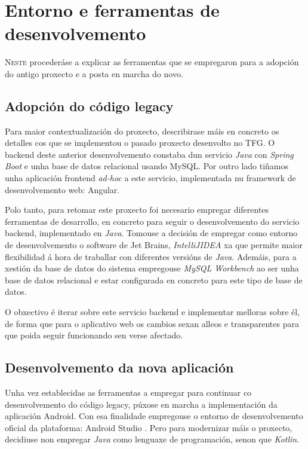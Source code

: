 \chapter{Entorno e ferramentas de desenvolvemento}
\label{chap:ferramentas}

\lettrine{N}{este} procederáse a explicar as ferramentas que se empregaron para a adopción do antigo proxecto e a posta en marcha do novo.


\section{Adopción do código legacy}
\label{sec:adopcion-legacy}

Para maior contextualización do proxecto, describirase máis en concreto os detalles cos que se implementou o pasado proxecto desenvolto no TFG\cite{TFGLuis}. O backend deste anterior desenvolvemento constaba dun servicio \textit{Java} con \textit{Spring Boot} \cite{SpringBoot} e unha base de datos relacional usando MySQL\cite{mysql}.  Por outro lado tiñamos unha aplicación frontend \textit{ad-hoc} a este servicio, implementada nu framework de desenvolvemento web: Angular\cite{angular}.

Polo tanto, para retomar este proxecto foi necesario empregar diferentes ferramentas de desarrollo, en concreto para seguir o desenvolvemento do servicio backend, implementado en \textit{Java}. Tomouse a decisión de empregar como entorno de desenvolvemento o software de Jet Brains, \textit{IntelliJIDEA}\cite{IntelliJIDEA} xa que permite maior flexibilidad á hora de traballar con diferentes versións de \textit{Java}. Ademáis, para a xestión da base de datos do sistema empregouse \textit{MySQL Workbench} ao ser unha base de datos relacional e estar configurada en concreto para este tipo de base de datos.

O obxectivo é iterar sobre este servicio backend e implementar melloras sobre él, de forma que para o aplicativo web os cambios sexan alleos e transparentes para que poida seguir funcionando sen verse afectado.

\section{Desenvolvemento da nova aplicación}
\label{sec:nova-app}

Unha vez establecidas as ferramentas a empregar para continuar co desenvolvemento do código legacy, púxose en marcha a implementación da aplicación Android. Con esa finalidade empregouse o entorno de desenvolvemento oficial da plataforma: Android Studio \cite{androidStudio}. Pero para modernizar máis o proxecto, decidiuse non empregar \textit{Java} como lenguaxe de programación, senon que \textit{Kotlin}\cite{kotlin}. 